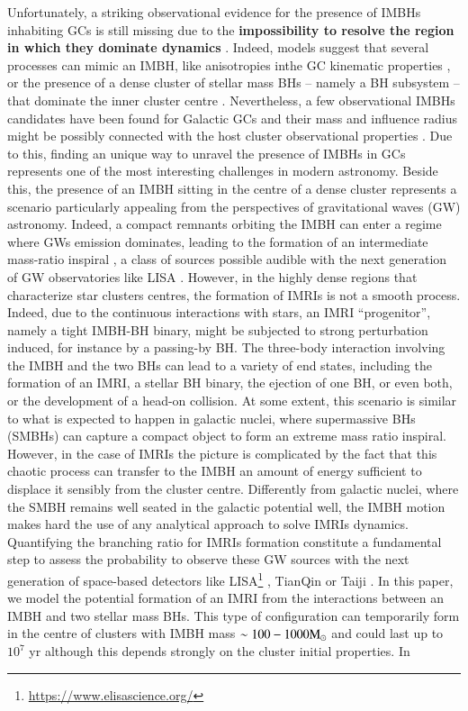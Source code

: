 \documentclass[article]{aa}
\newcommand{\Ms}{{\rm M}_\odot}
\begin{document}
Unfortunately, a striking observational evidence for the presence of IMBHs inhabiting GCs is still missing due to the {\bf impossibility to resolve the region in which they dominate dynamics} \citep[for recent reviews see][]{mezcua17,greene19}. Indeed, models suggest that several processes can mimic an IMBH, like anisotropies inthe GC kinematic  properties \citep{zocchi}, or the presence of a dense cluster of stellar mass BHs -- namely a BH subsystem -- that dominate the inner cluster centre \citep{AAG18b,AS16,vandermarel10}. Nevertheless, a few observational IMBHs candidates have been found for Galactic GCs
\citep{noyola10,lu13,lanzoni13,kiziltan17} and their mass and influence radius might be possibly connected with the host cluster observational 
properties \citep{Baumgardt17,AAG18a,AAG19}. Due to this, finding an unique way to unravel the presence of IMBHs in GCs represents one of the most interesting challenges in modern astronomy. Beside this, the presence of an IMBH sitting in the centre of a dense cluster represents a scenario particularly appealing from the perspectives of gravitational waves (GW) astronomy. Indeed, a compact remnants orbiting the IMBH can enter a regime where GWs emission dominates, leading to the formation of an intermediate mass-ratio inspiral \citep[IMRI,][]{konstantinidis13,leigh14,haster16,macleod16}, a class of sources possible audible with the next generation of GW observatories like LISA \citep{Will04,seoane07,amaro12,seoane18}. However, in the highly dense regions that characterize star clusters centres, the formation of IMRIs is not a smooth process. Indeed, due to the continuous interactions with stars, an IMRI ``progenitor'', namely a tight IMBH-BH binary, might be subjected to strong perturbation induced, for instance by a passing-by BH. The three-body interaction involving the IMBH and the two BHs can lead to a variety of end states, including the formation of an IMRI, a stellar BH binary, the ejection of one BH, or even both, or the development of a head-on collision. At some extent, this scenario is similar to what is expected to happen in galactic nuclei, where supermassive BHs (SMBHs) can capture a compact object to form an extreme mass ratio inspiral. However, in the case of IMRIs the picture is complicated by the fact that this chaotic process can transfer to the IMBH an amount of energy sufficient to displace it sensibly from the cluster centre. Differently from galactic nuclei, where the SMBH remains well seated in the galactic potential well, the IMBH motion makes hard the use of any analytical approach to solve IMRIs dynamics. Quantifying the branching ratio for IMRIs formation constitute a fundamental step to assess the probability to observe these GW sources with the next generation of space-based detectors like LISA\footnote{\url{https://www.elisascience.org/}} \citep{Will04,seoane07,amaro12}, TianQin \citep{tianqin16} or Taiji \citep{taiji17}. In this paper, we model the potential formation of an IMRI from the interactions between an IMBH and two stellar mass BHs. This type of  configuration can temporarily form in the centre of clusters with IMBH mass $\sim 100-1000\Ms$ \citep{konstantinidis13,macleod16} and could last up to $10^7$ yr \citep{macleod16} although this depends strongly on the cluster initial properties. In 
\end{document}
